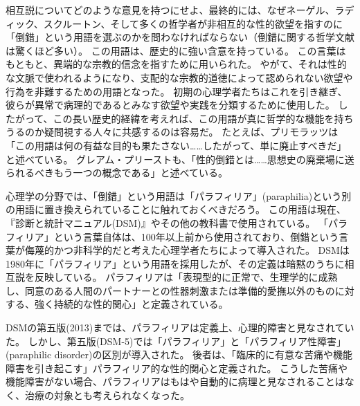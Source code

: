 \documentclass[paper=a4,book,openany]{jlreq}
\newcommand{\ig}[1]{}           %
\begin{document}
相互説についてどのような意見を持つにせよ、最終的には、なぜネーゲル、ラディック、スクルートン、そして多くの哲学者が非相互的な性的欲望を指すのに「倒錯」という用語を選ぶのかを問わなければならない（倒錯に関する哲学文献は驚くほど多い）。
この用語は、歴史的に強い含意を持っている。
この言葉はもともと、異端的な宗教的信念を指すために用いられた。
やがて、それは性的な文脈で使われるようになり、支配的な宗教的道徳によって認められない欲望や行為を非難するための用語となった。
初期の心理学者たちはこれを引き継ぎ、彼らが異常で病理的であるとみなす欲望や実践を分類するために使用した。
したがって、この長い歴史的経緯を考えれば、この用語が真に哲学的な機能を持ちうるのか疑問視する人々に共感するのは容易だ。
たとえば、プリモラッツは「この用語は何の有益な目的も果たさない……したがって、単に廃止すべきだ」と述べている\citep[p.64]{primoratz99:_ethic_and_sex}。
グレアム・プリーストも、「性的倒錯とは……思想史の廃棄場に送られるべきもう一つの概念である」と述べている\citep[p.371]{priest97:_sexual_perver}。

心理学の分野では、「倒錯」という用語は「パラフィリア」(paraphilia)という別の用語に置き換えられていることに触れておくべきだろう。
この用語は現在、『診断と統計マニュアル(DSM)』\ig{診断と統計マニュアル}やその他の教科書で使用されている。
「パラフィリア」という言葉自体は、100年以上前から使用されており、倒錯という言葉が侮蔑的かつ非科学的だと考えた心理学者たちによって導入された。
DSMは1980年に「パラフィリア」という用語を採用したが、その定義は暗黙のうちに相互説を反映している。
パラフィリアは「表現型的に正常で、生理学的に成熟し、同意のある人間のパートナーとの性器刺激または準備的愛撫以外のものに対する、強く持続的な性的関心」と定義されている\citep[p. 685]{APA13:DSM}。

DSMの第五版(2013)までは、パラフィリアは定義上、心理的障害と見なされていた。
しかし、第五版(DSM-5)では「パラフィリア」と「パラフィリア性障害」(paraphilic disorder)の区別が導入された。
後者は、「臨床的に有意な苦痛や機能障害を引き起こす」パラフィリア的な性的関心と定義された\citep[p. 694]{APA13:DSM}\ig{診断と統計マニュアル}。
こうした苦痛や機能障害がない場合、パラフィリアはもはや自動的に病理と見なされることはなく、治療の対象とも考えられなくなった。
\end{document}
